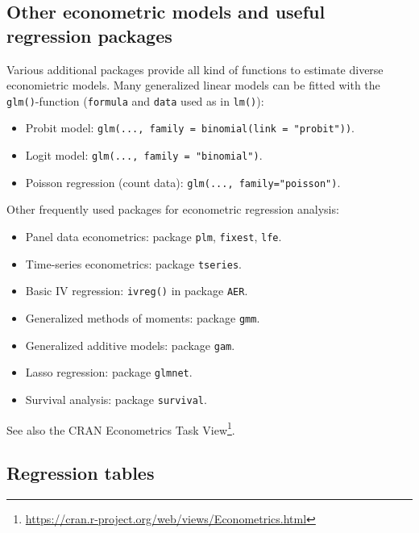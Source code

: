 \documentclass[
  12pt,
]{style/krantz}
\providecommand{\tightlist}{%
  \setlength{\itemsep}{0pt}\setlength{\parskip}{0pt}}
\renewcommand{\href}[2]{#2\footnote{\url{#1}}}
\begin{document}
\hypertarget{other-econometric-models-and-useful-regression-packages}{%
\subsection{Other econometric models and useful regression packages}\label{other-econometric-models-and-useful-regression-packages}}

Various additional packages provide all kind of functions to estimate diverse economietric models. Many generalized linear models can be fitted with the \texttt{glm()}-function (\texttt{formula} and \texttt{data} used as in \texttt{lm()}):

\begin{itemize}
\tightlist
\item
  Probit model: \texttt{glm(...,\ family\ =\ binomial(link\ =\ "probit"))}.
\item
  Logit model: \texttt{glm(...,\ family\ =\ "binomial")}.
\item
  Poisson regression (count data): \texttt{glm(...,\ family="poisson")}.
\end{itemize}

Other frequently used packages for econometric regression analysis:

\begin{itemize}
\tightlist
\item
  Panel data econometrics: package \texttt{plm}, \texttt{fixest}, \texttt{lfe}.
\item
  Time-series econometrics: package \texttt{tseries}.
\item
  Basic IV regression: \texttt{ivreg()} in package \texttt{AER}.
\item
  Generalized methods of moments: package \texttt{gmm}.
\item
  Generalized additive models: package \texttt{gam}.
\item
  Lasso regression: package \texttt{glmnet}.
\item
  Survival analysis: package \texttt{survival}.
\end{itemize}

See also the \href{https://cran.r-project.org/web/views/Econometrics.html}{CRAN Econometrics Task View}.

\hypertarget{regression-tables}{%
\subsection{Regression tables}\label{regression-tables}}
\end{document}
